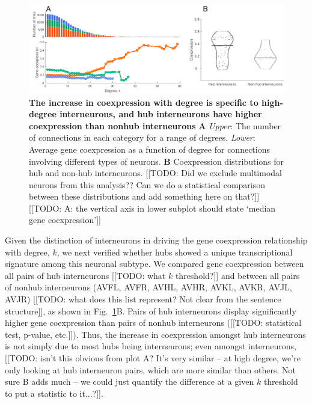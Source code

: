 \documentclass[10pt,letterpaper]{article}
\begin{document}
\begin{figure}[h]
\centering
   \includegraphics[width=1\textwidth]{TypeDegree.pdf}
 \caption{
\textbf{The increase in coexpression with degree is specific to high-degree interneurons, and hub interneurons have higher coexpression than nonhub interneurons}
\textbf{A} \emph{Upper}: The number of connections in each category for a range of degrees.
\emph{Lower}: Average gene coexpression as a function of degree for connections involving different types of neurons.
\textbf{B} Coexpression distributions for hub and non-hub interneurons.
[[TODO: Did we exclude multimodal neurons from this analysis?? Can we do a statistical comparison between these distributions and add something here on that?]]
[[TODO: A: the vertical axis in lower subplot should state `median gene coexpression']]
 \label{fig:interneuron_dep}
}
\end{figure}

Given the distinction of interneurons in driving the gene coexpression relationship with degree, $k$, we next verified whether hubs showed a unique transcriptional signature among this neuronal subtype.
We compared gene coexpression between all pairs of hub interneurons [[TODO: what $k$ threshold?]] and between all pairs of nonhub interneurons (AVFL, AVFR, AVHL, AVHR, AVKL, AVKR, AVJL, AVJR) [[TODO: what does this list represent? Not clear from the sentence structure]], as shown in Fig.~\ref{fig:interneuron_dep}B.
Pairs of hub interneurons display significantly higher gene coexpression than pairs of nonhub interneurons ([[TODO: statistical test, p-value, etc.]]).
Thus, the increase in coexpression amongst hub interneurons is not simply due to most hubs being interneurons;  even amongst interneurons, [[TODO: isn't this obvious from plot A? It's very similar -- at high degree, we're only looking at hub interneuron pairs, which are more similar than others. Not sure B adds much -- we could just quantify the difference at a given $k$ threshold to put a statistic to it...?]].
\end{document}
